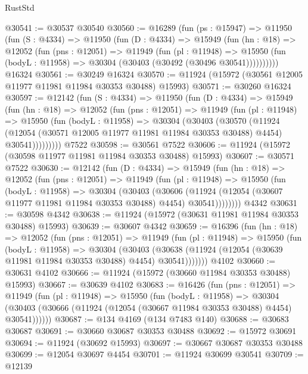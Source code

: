 \begin{lexlean}{RustStd}
\begin{coremodule}
@30541 := @30537 @30540
@30560 := @16289
    (fun (ps : @15947) =>
    @11950
      (fun (S : @4334) =>
      @11950
        (fun (D : @4334) =>
        @15949
          (fun (hn : @18) =>
          @12052
            (fun (pns : @12051) =>
            @11949
              (fun (pl : @11948) =>
              @15950 (fun (bodyL : @11958) => @30304 (@30403 (@30492 (@30496 @30541))))))))))
    @16324
@30561 := @30249 @16324
@30570 := @11924 (@15972 (@30561 @12005 @11977 @11981 @11984 @30353 @30488) @15993)
@30571 := @30260 @16324
@30597 := @12142
    (fun (S : @4334) =>
    @11950
      (fun (D : @4334) =>
      @15949
        (fun (hn : @18) =>
        @12052
          (fun (pns : @12051) =>
          @11949
            (fun (pl : @11948) =>
            @15950
              (fun (bodyL : @11958) =>
              @30304
                (@30403
                  (@30570
                    (@11924
                      (@12054 (@30571 @12005 @11977 @11981 @11984 @30353 @30488) @4454)
                      @30541)))))))))
    @7522
@30598 := @30561 @7522
@30606 := @11924 (@15972 (@30598 @11977 @11981 @11984 @30353 @30488) @15993)
@30607 := @30571 @7522
@30630 := @12142
    (fun (D : @4334) =>
    @15949
      (fun (hn : @18) =>
      @12052
        (fun (pns : @12051) =>
        @11949
          (fun (pl : @11948) =>
          @15950
            (fun (bodyL : @11958) =>
            @30304
              (@30403
                (@30606
                  (@11924 (@12054 (@30607 @11977 @11981 @11984 @30353 @30488) @4454) @30541))))))))
    @4342
@30631 := @30598 @4342
@30638 := @11924 (@15972 (@30631 @11981 @11984 @30353 @30488) @15993)
@30639 := @30607 @4342
@30659 := @16396
    (fun (hn : @18) =>
    @12052
      (fun (pns : @12051) =>
      @11949
        (fun (pl : @11948) =>
        @15950
          (fun (bodyL : @11958) =>
          @30304
            (@30403
              (@30638 (@11924 (@12054 (@30639 @11981 @11984 @30353 @30488) @4454) @30541)))))))
    @4102
@30660 := @30631 @4102
@30666 := @11924 (@15972 (@30660 @11984 @30353 @30488) @15993)
@30667 := @30639 @4102
@30683 := @16426
    (fun (pns : @12051) =>
    @11949
      (fun (pl : @11948) =>
      @15950
        (fun (bodyL : @11958) =>
        @30304 (@30403 (@30666 (@11924 (@12054 (@30667 @11984 @30353 @30488) @4454) @30541))))))
@30687 := @134 @4169 (@134 @7483 @140)
@30688 := @30683 @30687
@30691 := @30660 @30687 @30353 @30488
@30692 := @15972 @30691
@30694 := @11924 (@30692 @15993)
@30697 := @30667 @30687 @30353 @30488
@30699 := @12054 @30697 @4454
@30701 := @11924 @30699 @30541
@30709 := @12139

\end{coremodule}
\end{lexlean}
